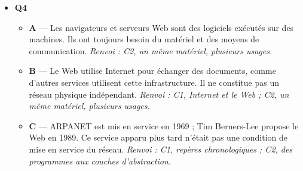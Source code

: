 \begin{itemize}
\begin{itemize}
  \end{itemize}
  \item \textbf{Q4}
  \begin{itemize}
    \item \textbf{A} — Les navigateurs et serveurs Web sont des logiciels exécutés sur des machines. Ils ont toujours besoin du matériel et des moyens de communication. \emph{Renvoi : C2, un même matériel, plusieurs usages.}
    \item \textbf{B} — Le Web utilise Internet pour échanger des documents, comme d'autres services utilisent cette infrastructure. Il ne constitue pas un réseau physique indépendant. \emph{Renvoi : C1, Internet et le Web ; C2, un même matériel, plusieurs usages.}
    \item \textbf{C} — ARPANET est mis en service en 1969 ; Tim Berners-Lee propose le Web en 1989. Ce service apparu plus tard n'était pas une condition de mise en service du réseau. \emph{Renvoi : C1, repères chronologiques ; C2, des programmes aux couches d'abstraction.}
  \end{itemize}
\end{itemize}
\fi
